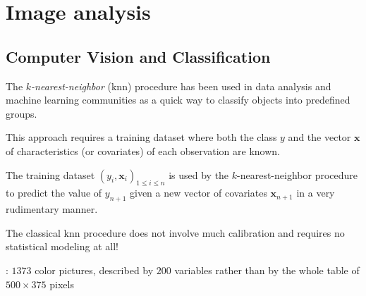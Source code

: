 \newcommand{\ds}{\displaystyle}
\section{Image analysis}
\begin{slide}
\tableofcontents[sectionstyle=show/hide,subsectionstyle=show/shaded/hide]

\end{slide}

\subsection{Computer Vision and Classification}\begin{slide}

The {\em $k$-nearest-neighbor} (knn) procedure has been used in data
analysis and machine learning communities as a quick way to classify objects into predefined groups.

\vs\pause This approach requires a training dataset where both the class $y$ and the vector $\mathbf{x}$
of characteristics (or covariates) of each observation are known. 

\end{slide}\begin{slide}

The training dataset $\left(y_i,\mathbf{x}_i\right)_{1\le i\le n}$ is used by the $k$-nearest-neighbor procedure to predict the value
of $y_{n+1}$ given a new vector of covariates $\mathbf{x}_{n+1}$ in a very rudimentary manner. 

\vs\pause {}

\end{slide}\begin{slide}

The classical knn procedure does not involve much calibration and requires no statistical modeling at all!

\vs\pause {}

\end{slide}\begin{slide}

: $1373$ color pictures, described by $200$ variables rather than by
the whole table of $500\times 375$ pixels


\end{slide}
